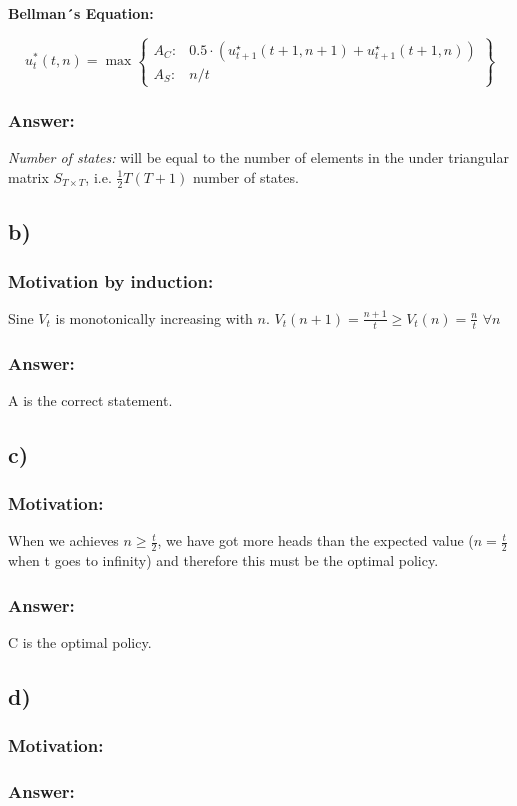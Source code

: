 \documentclass{article}
\begin{document}
\textbf{Bellman´s Equation:}

\begin{equation}
    u_{t}^{*}(t,n) = \max
    \left\{\begin{matrix}
    A_C: &  0.5 \cdot\left( u_{t+1}^{\star}\left(t+1 ,n+1\right) + u_{t+1}^{\star}\left(t+1 ,n\right)\right)\\
    A_S: &  n/t
    \end{matrix}\right\}
\end{equation}

\subsubsection*{Answer:}
\textit{Number of states:} will be equal to the number of elements in the under triangular matrix $S_{T\times T}$, i.e. $\frac{1}{2}T(T+1)$ number of states.

\subsection*{b)}
\subsubsection*{Motivation by induction:}
Sine $V_t$ is monotonically increasing with $n$. $V_t(n+1) = \frac{n+1}{t} \geq V_t(n) = \frac{n}{t}$ $\forall n$ 

\subsubsection*{Answer:}
A is the correct statement.

\subsection*{c)}
\subsubsection*{Motivation:}

When we achieves $n\geq \frac{t}{2}$, we have got more heads than the expected value ($ n = \frac{t}{2}$ when t goes to infinity) and therefore this must be the optimal policy. 




\subsubsection*{Answer:}
C is the optimal policy.
\subsection*{d)}
\subsubsection*{Motivation:}
\subsubsection*{Answer:}
\end{document}
